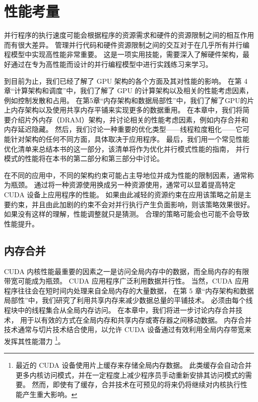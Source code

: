 \section{性能考量}
并行程序的执行速度可能会根据程序的资源需求和硬件的资源限制之间的相互作用而有很大差异。 
管理并行代码和硬件资源限制之间的交互对于在几乎所有并行编程模型中实现高性能非常重要。 
这是一项实用技能，需要深入了解硬件架构，最好通过在专为高性能而设计的并行编程模型中进行实践练习来学习。

到目前为止，我们已经了解了 GPU 架构的各个方面及其对性能的影响。 
在第 4 章“计算架构和调度”中，我们了解了 GPU 的计算架构以及相关的性能考虑因素，例如控制发散和占用。 
在第5章“内存架构和数据局部性”中，我们了解了GPU的片上内存架构以及使用共享内存平铺来实现更多的数据重用。 
在本章中，我们将简要介绍片外内存（DRAM）架构，并讨论相关的性能考虑因素，例如内存合并和内存延迟隐藏。 
然后，我们讨论一种重要的优化类型——线程粒度粗化——它可能针对架构的任何不同方面，具体取决于应用程序。 
最后，我们用一个常见性能优化清单来总结本书的这一部分，该清单将作为优化并行模式性能的指南，
并行模式的性能将在本书的第二部分和第三部分中讨论。

在不同的应用中，不同的架构约束可能占主导地位并成为性能的限制因素，通常称为瓶颈。 
通过将一种资源使用换成另一种资源使用，通常可以显着提高特定 CUDA 设备上应用程序的性能。 
如果由此减轻的资源约束在应用该策略之前是主要约束，并且由此加剧的约束不会对并行执行产生负面影响，则该策略效果很好。 
如果没有这样的理解，性能调整就只是猜测。 合理的策略可能会也可能不会导致性能提升。

\subsection{内存合并}
CUDA 内核性能最重要的因素之一是访问全局内存中的数据，而全局内存的有限带宽可能成为瓶颈。 
CUDA 应用程序广泛利用数据并行性。 当然，CUDA 应用程序往往会在短时间内处理来自全局内存的大量数据，
在第 5 章“内存架构和数据局部性”中，我们研究了利用共享内存来减少数据总量的平铺技术。 
必须由每个线程块中的线程集合从全局内存访问。 在本章中，我们将进一步讨论内存合并技术，
用于以有效的方式在全局内存和共享内存或寄存器之间移动数据。 
内存合并技术通常与切片技术结合使用，以允许 CUDA 设备通过有效利用全局内存带宽来发挥其性能潜力
\footnote{最近的 CUDA 设备使用片上缓存来存储全局内存数据。 
此类缓存会自动合并更多内核访问模式，并在一定程度上减少程序员手动重新安排其访问模式的需要。 
然而，即使有了缓存，合并技术在可预见的将来仍将继续对内核执行性能产生重大影响。}。

